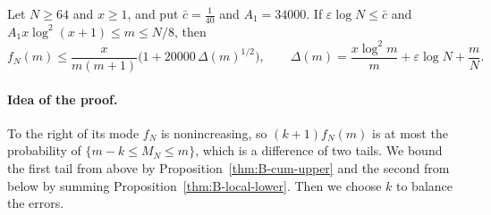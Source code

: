 \begin{proposition}\label{thm:B-local-upper}
Let $N\ge64$ and $x\ge1$, and put $\bar c=\frac1{40}$ and $A_1=34000$. If $\varepsilon\log
N\le\bar c$ and $A_1x\log^2(x+1)\le m\le N/8$, then
\[
 f_N(m)\le\frac{x}{m(m+1)}\bigl(1+20000\,\Delta(m)^{1/2}\bigr),\qquad
 \Delta(m)=\frac{x\log^2m}m+\varepsilon\log N+\frac mN .
\]
\end{proposition}

\paragraph{Idea of the proof.}
To the right of its mode $f_N$ is nonincreasing, so $(k+1)f_N(m)$ is at most
the probability of $\{m-k\le M_N\le m\}$, which is a difference of two tails.
We bound the first tail from above by
Proposition~\ref{thm:B-cum-upper} and the second from below by summing
Proposition~\ref{thm:B-local-lower}. Then we choose $k$ to balance the
errors.

